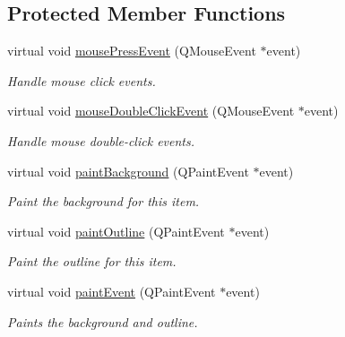 \subsection*{Protected Member Functions}
\begin{DoxyCompactItemize}
\item 
virtual void \hyperlink{class_u_i_1_1_item_widget_adb53c68a12da21d1d7250904b4c5df4a}{mouse\-Press\-Event} (Q\-Mouse\-Event $\ast$event)
\begin{DoxyCompactList}\small\item\em Handle mouse click events. \end{DoxyCompactList}\item 
virtual void \hyperlink{class_u_i_1_1_item_widget_a9c7e307a6d11ea2877e951873d4b1f37}{mouse\-Double\-Click\-Event} (Q\-Mouse\-Event $\ast$event)
\begin{DoxyCompactList}\small\item\em Handle mouse double-\/click events. \end{DoxyCompactList}\item 
virtual void \hyperlink{class_u_i_1_1_item_widget_af6b010312d523a1c5fca13b8fd25e625}{paint\-Background} (Q\-Paint\-Event $\ast$event)
\begin{DoxyCompactList}\small\item\em Paint the background for this item. \end{DoxyCompactList}\item 
virtual void \hyperlink{class_u_i_1_1_item_widget_ab90d676b6864ebb50aa6f79bc1b4929d}{paint\-Outline} (Q\-Paint\-Event $\ast$event)
\begin{DoxyCompactList}\small\item\em Paint the outline for this item. \end{DoxyCompactList}\item 
virtual void \hyperlink{class_u_i_1_1_item_widget_a636f6170e71d0dded72cf7fb040cbc3e}{paint\-Event} (Q\-Paint\-Event $\ast$event)
\begin{DoxyCompactList}\small\item\em Paints the background and outline. \end{DoxyCompactList}\end{DoxyCompactItemize}
